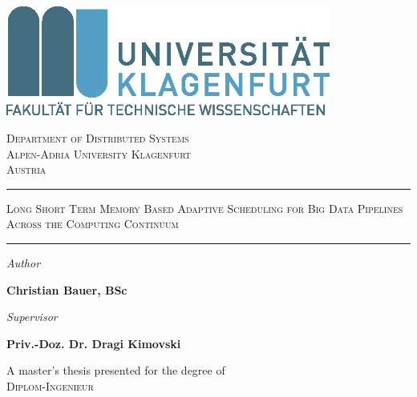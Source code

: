 \begin{titlingpage}
    \begin{center}
        \includegraphics[width=0.8\textwidth]{figures/AAU_LOGO_2017.png}

        \vspace{0.5cm}

        \textsc{Department of Distributed Systems}\\
        \textsc{Alpen-Adria University Klagenfurt}\\
        \textsc{Austria}\\

        \date{\today}

        \vspace{3.5cm}

        \LARGE
        \par\rule{\textwidth}{2pt}
        \textsc{Long Short Term Memory Based Adaptive Scheduling for Big Data Pipelines Across the Computing Continuum}
        \par\rule{\textwidth}{2pt} 
        \vspace{0.5cm}
            
        \vspace{3cm}

        \large
        \begin{minipage}{.5\textwidth}
            \textsl{Author}

            \textbf{Christian Bauer, BSc}
        \end{minipage}%
        \begin{minipage}{.5\textwidth}
            \textsl{Supervisor}

            \textbf{Priv.-Doz. Dr. Dragi Kimovski}
        \end{minipage}



       \vfill
            
       A master's thesis presented for the degree of\\
       \textsc{Diplom-Ingenieur}
            
     
            
    \end{center}
\end{titlingpage}